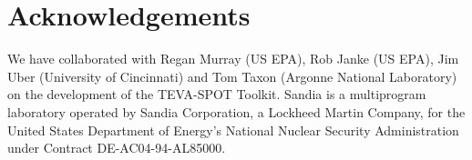 \section*{Acknowledgements}

We have collaborated with Regan Murray (US EPA), Rob Janke (US EPA),
Jim Uber (University of Cincinnati) and Tom Taxon (Argonne National
Laboratory) on the development of the TEVA-SPOT Toolkit. Sandia is
a multiprogram laboratory operated by Sandia Corporation, a Lockheed
Martin Company, for the United States Department of Energy's National
Nuclear Security Administration under Contract DE-AC04-94-AL85000.
